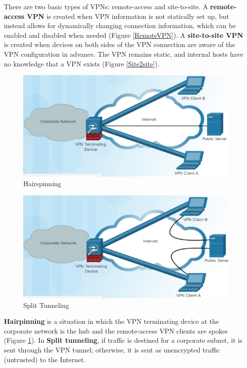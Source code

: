 There are two basic types of VPNs: remote-access and site-to-site. A \textbf{remote-access VPN} is created when VPN information is not statically set up, but instead allows for dynamically changing connection information, which can be enabled and disabled when needed (Figure \ref{RemoteVPN}). A \textbf{site-to-site VPN} is created when devices on both sides of the VPN connection are aware of the VPN configuration in advance. The VPN remains static, and internal hosts have no knowledge that a VPN exists (Figure \ref{Site2site}).\\

\begin{figure}[hbtp]
\caption{Hairspinning}\label{Hairspinning}
\centering
\includegraphics[scale=1]{pictures/Hairspinning.PNG}
\end{figure}

\begin{figure}[hbtp]
\caption{Split Tunneling}
\centering
\includegraphics[scale=1]{pictures/SplitTunneling.PNG}
\end{figure}



\textbf{Hairpinning} is a situation in which the VPN terminating device at the corporate network is the hub and the remote-access VPN clients are spokes (Figure \ref{Hairspinning}). In \textbf{Split tunneling}, if traffic is destined for a corporate subnet, it is sent through the VPN tunnel; otherwise, it is sent as unencrypted traffic (untrusted) to the Internet.

